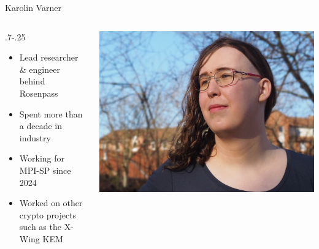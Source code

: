 \begin{frame}{Karolin Varner}
  \begin{columns}[fullwidth,c]
	\hspace*{.25\LeftSlideIndent}%
    \begin{column}{\dimexpr.7\linewidth-.25\LeftSlideIndent}
      \begin{itemize}
        \item Lead researcher \& engineer behind Rosenpass
        \item Spent more than a decade in industry
        \item Working for MPI-SP since 2024
        \item Worked on other crypto projects such as the X-Wing KEM
      \end{itemize}
    \end{column}%
    \begin{column}{.3\linewidth}
      \includegraphics[width=.92\linewidth,trim=200 0 100 0,clip]{graphics/karolin-varner.jpg}
    \end{column}
  \end{columns}
\end{frame}

